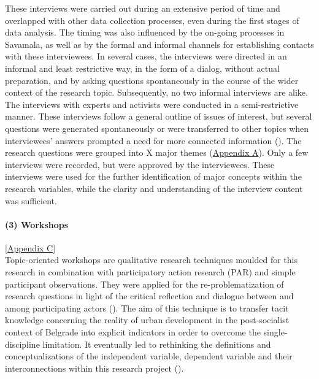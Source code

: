 \documentclass[11pt]{report}
\begin{document}
These interviews were carried out during an extensive period of time and overlapped with other data collection processes, even during the first stages of data analysis. The timing was also influenced by the on-going processes in Savamala, as well as by the formal and informal channels for establishing  contacts with these interviewees. In several cases, the interviews were directed in an informal and least restrictive way, in the form of a dialog, without actual preparation, and by  asking questions spontaneously in the course of the wider context of the research topic. Subsequently, no two informal interviews are alike. The interviews with experts and activists were conducted in a semi-restrictive manner. These interviews follow a general outline of issues of interest, but several questions were generated spontaneously or were transferred to other topics when interviewees’ answers prompted a need for more connected information (\href{ref}{\citealt{payne_key_2004}}). The research questions were grouped into X major themes (\href{Appendix}{Appendix A}). Only a few interviews were recorded, but were approved by the interviewees. These interviews were used for the further identification of major concepts within the research variables, while the clarity and understanding of the interview content was sufficient. 

\paragraph{(3) Workshops} 
[\href{ref}{Appendix C}]
\\
Topic-oriented workshops are qualitative research techniques moulded for this research in combination with participatory action research (PAR) and simple participant observations. They were applied for the re-problematization of research questions in light of the critical reflection and dialogue between and among participating actors (\href{Mc}{\citealt{mcintyre_participatory_2008}}). The aim of this technique is to transfer tacit knowledge concerning the reality of urban development in the post-socialist context of Belgrade into explicit indicators in order to overcome the single- discipline limitation. It eventually led to rethinking the definitions and conceptualizations of the independent variable, dependent variable and their interconnections within this research project (\href{Whyte}{\citealt{whyte_participatory_1991}}). 
\\
\end{document}
